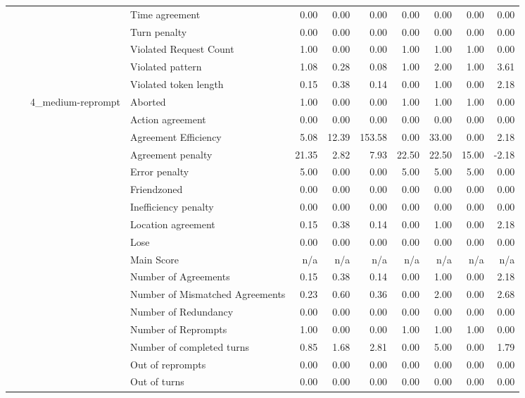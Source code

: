 \begin{tabular}{llllrrrrrrr}
 &  &  & Time agreement & 0.00 & 0.00 & 0.00 & 0.00 & 0.00 & 0.00 & 0.00 \\
 &  &  & Turn penalty & 0.00 & 0.00 & 0.00 & 0.00 & 0.00 & 0.00 & 0.00 \\
 &  &  & Violated Request Count & 1.00 & 0.00 & 0.00 & 1.00 & 1.00 & 1.00 & 0.00 \\
 &  &  & Violated pattern & 1.08 & 0.28 & 0.08 & 1.00 & 2.00 & 1.00 & 3.61 \\
 &  &  & Violated token length & 0.15 & 0.38 & 0.14 & 0.00 & 1.00 & 0.00 & 2.18 \\
\cline{3-11}
 &  & \multirow[t]{27}{*}{4_medium-reprompt} & Aborted & 1.00 & 0.00 & 0.00 & 1.00 & 1.00 & 1.00 & 0.00 \\
 &  &  & Action agreement & 0.00 & 0.00 & 0.00 & 0.00 & 0.00 & 0.00 & 0.00 \\
 &  &  & Agreement Efficiency & 5.08 & 12.39 & 153.58 & 0.00 & 33.00 & 0.00 & 2.18 \\
 &  &  & Agreement penalty & 21.35 & 2.82 & 7.93 & 22.50 & 22.50 & 15.00 & -2.18 \\
 &  &  & Error penalty & 5.00 & 0.00 & 0.00 & 5.00 & 5.00 & 5.00 & 0.00 \\
 &  &  & Friendzoned & 0.00 & 0.00 & 0.00 & 0.00 & 0.00 & 0.00 & 0.00 \\
 &  &  & Inefficiency penalty & 0.00 & 0.00 & 0.00 & 0.00 & 0.00 & 0.00 & 0.00 \\
 &  &  & Location agreement & 0.15 & 0.38 & 0.14 & 0.00 & 1.00 & 0.00 & 2.18 \\
 &  &  & Lose & 0.00 & 0.00 & 0.00 & 0.00 & 0.00 & 0.00 & 0.00 \\
 &  &  & Main Score & n/a & n/a & n/a & n/a & n/a & n/a & n/a \\
 &  &  & Number of Agreements & 0.15 & 0.38 & 0.14 & 0.00 & 1.00 & 0.00 & 2.18 \\
 &  &  & Number of Mismatched Agreements & 0.23 & 0.60 & 0.36 & 0.00 & 2.00 & 0.00 & 2.68 \\
 &  &  & Number of Redundancy & 0.00 & 0.00 & 0.00 & 0.00 & 0.00 & 0.00 & 0.00 \\
 &  &  & Number of Reprompts & 1.00 & 0.00 & 0.00 & 1.00 & 1.00 & 1.00 & 0.00 \\
 &  &  & Number of completed turns & 0.85 & 1.68 & 2.81 & 0.00 & 5.00 & 0.00 & 1.79 \\
 &  &  & Out of reprompts & 0.00 & 0.00 & 0.00 & 0.00 & 0.00 & 0.00 & 0.00 \\
 &  &  & Out of turns & 0.00 & 0.00 & 0.00 & 0.00 & 0.00 & 0.00 & 0.00 \\

\end{tabular}
